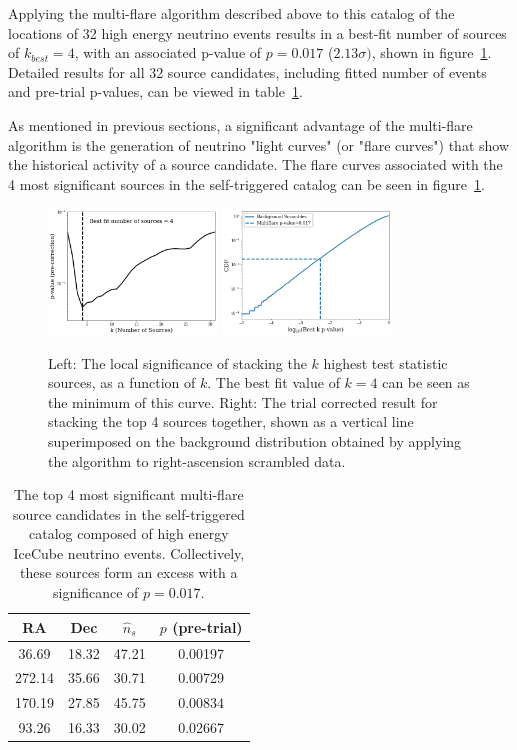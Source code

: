 Applying the multi-flare algorithm described above to this catalog of the locations of 32 high energy neutrino events results in a best-fit number of sources of $k_{best}=4$, with an associated p-value of $p=0.017$ ($2.13\sigma)$, shown in figure~\ref{fig:stresults}. Detailed results for all 32 source candidates, including fitted number of events and pre-trial p-values, can be viewed in table~\ref{tab:stresults}. 

As mentioned in previous sections, a significant advantage of the multi-flare algorithm is the generation of neutrino "light curves" (or "flare curves") that show the historical activity of a source candidate. The flare curves associated with the 4 most significant sources in the self-triggered catalog can be seen in figure~\ref{fig:stresults}.

\begin{figure}[h]
\centering
\includegraphics[width=0.4\textwidth]{figs/st_pcurve.png}
\includegraphics[width=0.4\textwidth]{figs/st_obsresult.png}
\caption{Left: The local significance of stacking the $k$ highest test statistic sources, as a function of $k$. The best fit value of $k=4$ can be seen as the minimum of this curve. Right: The trial corrected result for stacking the top 4 sources together, shown as a vertical line superimposed on the background distribution obtained by applying the algorithm to right-ascension scrambled data.}
\label{fig:stresults}
\end{figure}

\begin{table}[h!]
\centering
 \begin{tabular}{||c c c c||} 
 \hline
 RA & Dec & $\hat{n}_s$ & $p$ (pre-trial) \\ [0.5ex] 
 \hline\hline
 36.69 & 18.32 & 47.21 & 0.00197 \\ 
 \hline
 272.14 & 35.66 & 30.71 & 0.00729 \\
 \hline
 170.19 & 27.85 & 45.75 & 0.00834 \\
 \hline
 93.26 & 16.33 & 30.02 & 0.02667 \\
 \hline
\end{tabular}
\caption{The top 4 most significant multi-flare source candidates in the self-triggered catalog composed of high energy IceCube neutrino events. Collectively, these sources form an excess with a significance of $p=0.017$.}
\label{tab:stresults}
\end{table}


